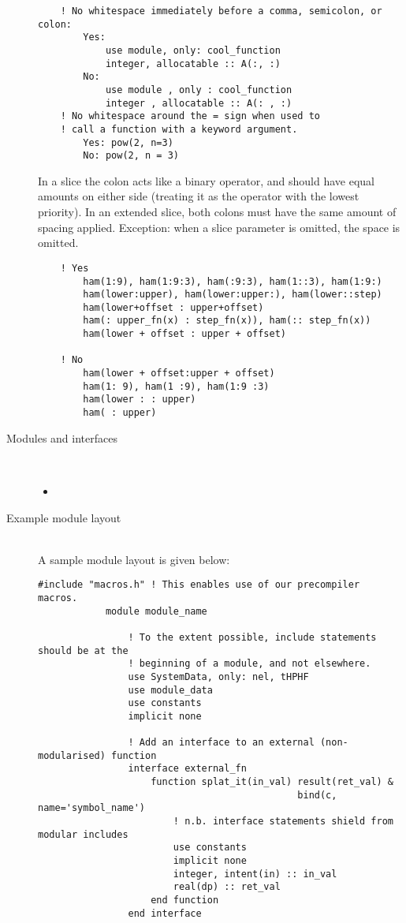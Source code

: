 \documentclass[a4paper,notitlepage]{scrreprt}
\newcommand\headitem[1]{\needspace{1.5\baselineskip}\item[{\boldmath #1 \nopagebreak}] \hfill \\ \nopagebreak}
\begin{document}
\begin{description}
\begin{lstlisting}
    ! No whitespace immediately before a comma, semicolon, or colon:
        Yes:
            use module, only: cool_function
            integer, allocatable :: A(:, :)
        No:
            use module , only : cool_function
            integer , allocatable :: A(: , :)
    ! No whitespace around the = sign when used to
    ! call a function with a keyword argument.
        Yes: pow(2, n=3)
        No: pow(2, n = 3)
        \end{lstlisting}
        In a slice the colon acts like a binary operator,
        and should have equal amounts on either side
        (treating it as the operator with the lowest priority).
        In an extended slice, both colons must have the same amount
        of spacing applied.
        Exception: when a slice parameter is omitted, the space is omitted.
        \begin{lstlisting}
    ! Yes
        ham(1:9), ham(1:9:3), ham(:9:3), ham(1::3), ham(1:9:)
        ham(lower:upper), ham(lower:upper:), ham(lower::step)
        ham(lower+offset : upper+offset)
        ham(: upper_fn(x) : step_fn(x)), ham(:: step_fn(x))
        ham(lower + offset : upper + offset)

    ! No
        ham(lower + offset:upper + offset)
        ham(1: 9), ham(1 :9), ham(1:9 :3)
        ham(lower : : upper)
        ham( : upper)
        \end{lstlisting}

	\headitem{Modules and interfaces}
		\begin{itemize}
			\item
		\end{itemize}

	\headitem{Example module layout}
		A sample module layout is given below:
		\begin{lstlisting}[gobble=12]
            #include "macros.h" ! This enables use of our precompiler macros.
            module module_name

            	! To the extent possible, include statements should be at the
				! beginning of a module, and not elsewhere.
            	use SystemData, only: nel, tHPHF
            	use module_data
            	use constants
            	implicit none

            	! Add an interface to an external (non-modularised) function
            	interface external_fn
            		function splat_it(in_val) result(ret_val) &
											  bind(c, name='symbol_name')
            			! n.b. interface statements shield from modular includes
            			use constants
            			implicit none
            			integer, intent(in) :: in_val
            			real(dp) :: ret_val
            		end function
            	end interface


\end{lstlisting}
\end{description}
\end{document}
